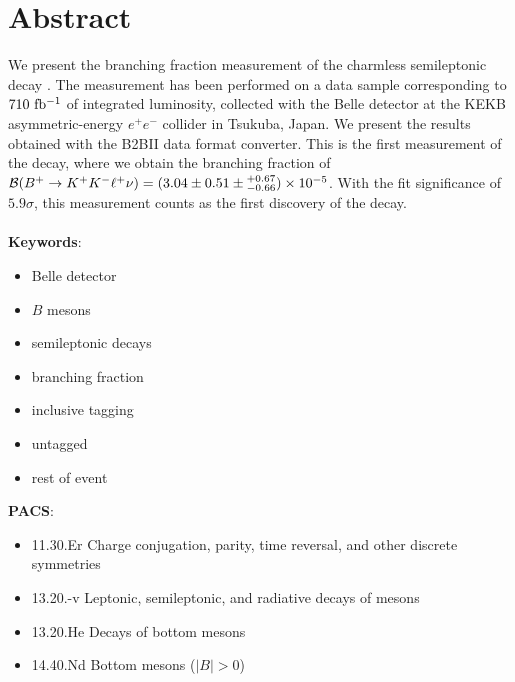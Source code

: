 \chapter*{Abstract}
We present the branching fraction measurement of the charmless semileptonic decay \decayb. The measurement has been performed on a data sample corresponding to $710\mathrm{~fb^{-1}}$ of integrated luminosity, collected with the Belle detector at the KEKB asymmetric-energy $e^+e^-$ collider in Tsukuba, Japan. We present the results obtained with the B2BII data format converter. This is the first measurement of the decay, where we obtain the branching fraction of $\mathcal{B}(B^+ \to K^+ K^- \ell^+ \nu) = (3.04 \pm 0.51 \pm {}^{+0.67}_{-0.66})\times 10^{-5}$. With the fit significance of $5.9\sigma$, this measurement counts as the first discovery of the decay.\\
\vspace{1cm}\\
{{\bf Keywords}:} 
\begin{itemize}
	\item Belle detector
	\item $B$ mesons
	\item semileptonic decays
	\item branching fraction
	\item inclusive tagging
	\item untagged
	\item rest of event
\end{itemize}
\vspace{1cm}
{{\bf PACS}:}
\begin{itemize}
	\item 11.30.Er Charge conjugation, parity, time reversal, and other discrete symmetries
	\item 13.20.-v Leptonic, semileptonic, and radiative decays of mesons
	\item 13.20.He Decays of bottom mesons 
	\item 14.40.Nd Bottom mesons ($|B|>0$) 
\end{itemize}

\pagestyle{empty}

\tableofcontents
\pagestyle{plain}
